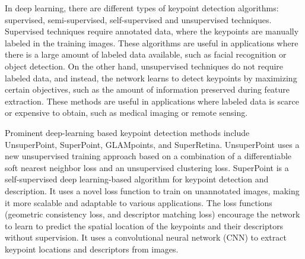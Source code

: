 \documentclass[10pt,twocolumn,letterpaper]{article}
\begin{document}
In deep learning, there are different types of keypoint detection algorithms: supervised, semi-supervised, self-supervised and unsupervised techniques. Supervised techniques require annotated data, where the keypoints are manually labeled in the training images. These algorithms are useful in applications where there is a large amount of labeled data available, such as facial recognition or object detection. On the other hand, unsupervised techniques do not require labeled data, and instead, the network learns to detect keypoints by maximizing certain objectives, such as the amount of information preserved during feature extraction. These methods are useful in applications where labeled data is scarce or expensive to obtain, such as medical imaging or remote sensing.

Prominent deep-learning based keypoint detection methods include UnsuperPoint, SuperPoint, GLAMpoints, and SuperRetina. UnsuperPoint \cite{christiansen2019unsuperpoint} uses a new unsupervised training approach based on a combination of a differentiable soft nearest neighbor loss and an unsupervised clustering loss. SuperPoint \cite{detone2018superpoint} is a self-supervised deep learning-based algorithm for keypoint detection and description. It uses a novel loss function to train on unannotated images, making it more scalable and adaptable to various applications. The loss functions (geometric consistency loss, and descriptor matching loss) encourage the network to learn to predict the spatial location of the keypoints and their descriptors without supervision. It uses a convolutional neural network (CNN) to extract keypoint locations and descriptors from images.
\end{document}
